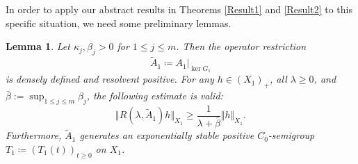 \documentclass[a4paper,11pt,reqno]{amsart}
\def\ka{\kappa}
\theoremstyle{plain}
\newtheorem{lemma}{Lemma}[section]
\numberwithin{equation}{section}
\begin{document}
In order to apply our abstract results in Theorems \ref{Result1} and \ref{Result2} to this specific situation, we need some preliminary lemmas.
\begin{lemma}\label{heat-star-exp-stab}
Let $\ka_j,\beta_j>0$ for $1 \le j\le m$. Then the operator restriction
\begin{equation*}
\tilde{A}_1\coloneqq A_1\vert_{\ker G_1}
\end{equation*}
is densely defined and resolvent positive. For any $h\in (X_1)_+$, all $\lambda\ge 0$, and $\bar{\beta}:=\sup_{1\le j\le m}\beta_j$, the following estimate is valid:
\begin{equation}\label{invers-estimate}
\Vert R(\lambda,\tilde{A}_1)h\Vert_{X_1}\ge \frac{1}{\lambda+\bar{\beta}}\Vert h\Vert_{X_1}.
\end{equation}
Furthermore, $\tilde{A}_1$ generates an exponentially stable positive $C_0$-semigroup $T_1\coloneqq (T_1(t))_{t\ge 0}$ on $X_1$.
\end{lemma}
\end{document}
